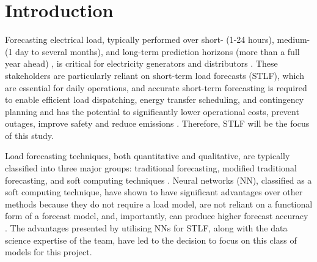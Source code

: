 \documentclass[mstat,12pt]{unswthesis}
\begin{document}
\afterpreface





%
%






\hypertarget{introduction}{%
\chapter{Introduction}\label{introduction}}

Forecasting electrical load, typically performed over short- (1-24 hours), medium- (1 day to several months), and long-term prediction horizons (more than a full year ahead) \cite{Yalcinoz2005}, is critical for electricity generators and distributors \cite{Djukanovic1995}\cite{Berk2018}. These stakeholders are particularly reliant on short-term load forecasts (STLF), which are essential for daily operations, and accurate short-term forecasting is required to enable efficient load dispatching, energy transfer scheduling, and contingency planning and has the potential to significantly lower operational costs, prevent outages, improve safety and reduce emissions \cite{KavousiFard2014}\cite{Dong2021}. Therefore, STLF will be the focus of this study.

Load forecasting techniques, both quantitative and qualitative, are typically classified into three major groups: traditional forecasting, modified traditional forecasting, and soft computing techniques \cite{Singh2013}. Neural networks (NN), classified as a soft computing technique, have shown to have significant advantages over other methods because they do not require a load model, are not reliant on a functional form of a forecast model, and, importantly, can produce higher forecast accuracy \cite{Djukanovic1995}. The advantages presented by utilising NNs for STLF, along with the data science expertise of the team, have led to the decision to focus on this class of models for this project.
\end{document}
